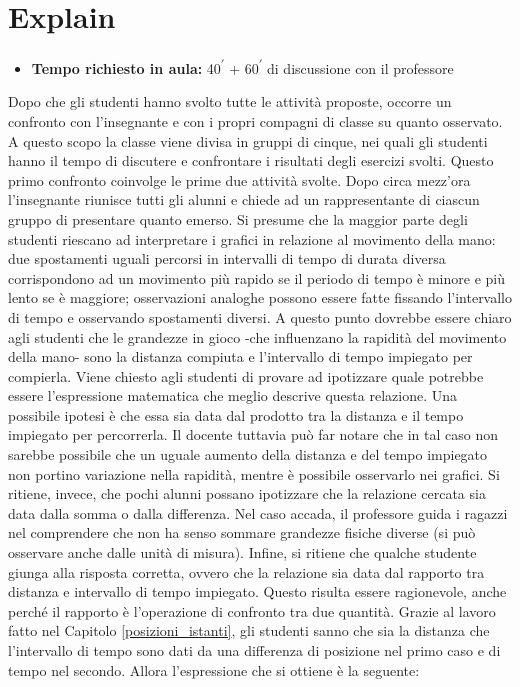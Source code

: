 \documentclass{report} \usepackage[T1]{fontenc} \usepackage[italian]{babel}
\begin{document}
\section{Explain}\label{velocità_explain}

\begin{itemize}
\item \textbf{Tempo richiesto in aula:} 40\textsuperscript{$\prime$}
      + 60\textsuperscript{$\prime$} di discussione con il professore
\end{itemize}

Dopo che gli studenti hanno svolto tutte le attività proposte, occorre un
confronto con l’insegnante e con i propri compagni di classe su quanto
osservato. A questo scopo la classe viene divisa in gruppi di cinque, nei quali gli
studenti hanno il tempo di discutere e confrontare i risultati degli esercizi
svolti. Questo primo confronto coinvolge le prime due attività svolte. Dopo
circa mezz’ora l’insegnante riunisce tutti gli alunni e chiede ad un
rappresentante di ciascun gruppo di presentare quanto emerso.
Si presume che la maggior parte degli studenti riescano ad interpretare i
grafici in relazione al movimento della mano: due spostamenti uguali percorsi
in intervalli di tempo di durata diversa corrispondono ad un movimento più
rapido se il periodo di tempo è minore e più lento se è maggiore; osservazioni
analoghe possono essere fatte fissando l’intervallo di tempo e osservando
spostamenti diversi.
A questo punto dovrebbe essere chiaro agli studenti che le grandezze in gioco
-che influenzano la rapidità del movimento della mano- sono la distanza compiuta
e l’intervallo di tempo impiegato per compierla. Viene chiesto
agli studenti di provare ad ipotizzare quale potrebbe essere l’espressione
matematica che meglio descrive questa relazione. Una possibile ipotesi è che
essa sia data dal prodotto tra la distanza e il tempo impiegato per
percorrerla. Il docente tuttavia può far notare che in tal caso non sarebbe
possibile che un uguale aumento della distanza e del tempo impiegato non portino
variazione nella rapidità, mentre è possibile osservarlo nei grafici. Si
ritiene, invece, che pochi alunni possano ipotizzare che la relazione cercata
sia data dalla somma o dalla differenza. Nel caso accada, il professore guida i
ragazzi nel comprendere che non ha senso  sommare grandezze fisiche diverse
(si può osservare anche dalle unità di misura). Infine, si
ritiene che qualche studente giunga alla risposta corretta, ovvero che la
relazione sia data dal rapporto tra distanza e intervallo di tempo impiegato.
Questo risulta essere ragionevole, anche perché il rapporto è l'operazione
di confronto tra due quantità.
Grazie al lavoro fatto nel Capitolo \ref{posizioni_istanti}, gli studenti sanno
che sia la  distanza che l’intervallo di tempo sono dati da una differenza
di posizione nel  primo caso e di tempo nel secondo. Allora l’espressione
che si ottiene è la seguente:
\end{document}
